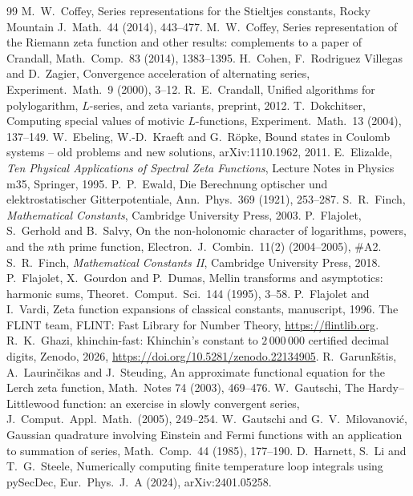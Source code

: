 \documentclass[11pt,reqno]{amsart}
\theoremstyle{definition}
\theoremstyle{remark}
\begin{document}
\begin{thebibliography}{99}
 M.~W.~Coffey, Series representations for the Stieltjes constants, Rocky Mountain J.\ Math.\ 44 (2014),
443--477.
 M.~W.~Coffey, Series representation of the Riemann zeta function and other results: complements to a paper of Crandall, Math.\ Comp.\ 83 (2014), 1383--1395.
 H.~Cohen, F.~Rodriguez Villegas and D.~Zagier, Convergence acceleration of alternating series, Experiment.\ Math.\ 9 (2000), 3--12.
 R.~E.~Crandall, Unified algorithms for polylogarithm, $L$-series, and zeta variants, preprint, 2012.
 T.~Dokchitser, Computing special values of motivic $L$-functions, Experiment.\ Math.\ 13 (2004), 137--149.
 W.~Ebeling, W.-D.~Kraeft and G.~R\"opke, Bound states in Coulomb systems -- old problems and new solutions, arXiv:1110.1962, 2011.
 E.~Elizalde, \emph{Ten Physical Applications of Spectral Zeta Functions}, Lecture Notes in Physics m35, Springer, 1995.
 P.~P.~Ewald, Die Berechnung optischer und elektrostatischer Gitterpotentiale, Ann.\ Phys.\ 369 (1921), 253--287.
 S.~R.~Finch, \emph{Mathematical Constants}, Cambridge University Press, 2003.
 P.~Flajolet, S.~Gerhold and B.~Salvy, On the non-holonomic character of logarithms, powers, and the $n$th prime function, Electron.\ J.\ Combin.\ 11(2) (2004--2005), \#A2.
 S.~R.~Finch, \emph{Mathematical Constants II}, Cambridge University Press, 2018.
 P.~Flajolet, X.~Gourdon and P.~Dumas, Mellin transforms and asymptotics: harmonic sums, Theoret.\ Comput.\ Sci.\ 144 (1995), 3--58.
 P.~Flajolet and I.~Vardi, Zeta function expansions of classical constants, manuscript, 1996.
 The FLINT team, FLINT: Fast Library for Number Theory, \url{https://flintlib.org}.
 R.~K.~Ghazi, khinchin-fast: Khinchin's constant to $2\,000\,000$ certified decimal digits, Zenodo, 2026, \url{https://doi.org/10.5281/zenodo.22134905}.
 R.~Garun\v{k}\v{s}tis, A.~Laurin\v{c}ikas and J.~Steuding, An approximate functional equation for the Lerch zeta function, Math.\ Notes 74 (2003), 469--476.
 W.~Gautschi, The Hardy--Littlewood function: an exercise in slowly convergent series, J.\ Comput.\ Appl.\ Math.\ (2005), 249--254.
 W.~Gautschi and G.~V.~Milovanovi\'c, Gaussian quadrature involving Einstein and Fermi functions with an application to summation of series, Math.\ Comp.\ 44 (1985), 177--190.
 D.~Harnett, S.~Li and T.~G.~Steele, Numerically computing finite temperature loop integrals using pySecDec, Eur.\ Phys.\ J.\ A (2024), arXiv:2401.05258.

\end{thebibliography}
\end{document}
